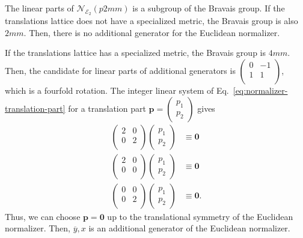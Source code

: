 The linear parts of $\mathcal{N}_{\mathcal{E}_{2}}(p2mm)$ is a subgroup of the Bravais group.
If the translations lattice does not have a specialized metric, the Bravais group is also $2mm$.
Then, there is no additional generator for the Euclidean normalizer.

If the translations lattice has a specialized metric, the Bravais group is $4mm$.
Then, the candidate for linear parts of additional generators is $\begin{pmatrix} 0 & -1 \\ 1 & 1 \\ \end{pmatrix}$, which is a fourfold rotation.
The integer linear system of Eq.~\eqref{eq:normalizer-translation-part} for a translation part $\bm{p} = \begin{pmatrix} p_{1} \\ p_{2} \end{pmatrix}$ gives
\begin{align*}
  \begin{pmatrix}
    2 & 0 \\
    0 & 2 \\
  \end{pmatrix}
  \begin{pmatrix} p_{1} \\ p_{2} \end{pmatrix}
  &\equiv \bm{0} \\
  \begin{pmatrix}
    2 & 0 \\
    0 & 0 \\
  \end{pmatrix}
  \begin{pmatrix} p_{1} \\ p_{2} \end{pmatrix}
  &\equiv \bm{0} \\
  \begin{pmatrix}
    0 & 0 \\
    0 & 2 \\
  \end{pmatrix}
  \begin{pmatrix} p_{1} \\ p_{2} \end{pmatrix}
  &\equiv \bm{0}.
\end{align*}
Thus, we can choose $\bm{p} = \bm{0}$ up to the translational symmetry of the Euclidean normalizer.
Then, $\overline{y},x$ is an additional generator of the Euclidean normalizer.
